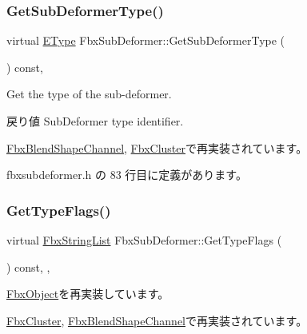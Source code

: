 \subsubsection{\texorpdfstring{Get\+Sub\+Deformer\+Type()}{GetSubDeformerType()}}
{\footnotesize\ttfamily virtual \hyperlink{class_fbx_sub_deformer_aed7eba8aabbb8b25a8ddbab127d67319}{E\+Type} Fbx\+Sub\+Deformer\+::\+Get\+Sub\+Deformer\+Type (\begin{DoxyParamCaption}{ }\end{DoxyParamCaption}) const\hspace{0.3cm}{\ttfamily [inline]}, {\ttfamily [virtual]}}

Get the type of the sub-\/deformer. \begin{DoxyReturn}{戻り値}
Sub\+Deformer type identifier. 
\end{DoxyReturn}


\hyperlink{class_fbx_blend_shape_channel_a1dba13e481ea7ba1874587ad92ee0347}{Fbx\+Blend\+Shape\+Channel}, \hyperlink{class_fbx_cluster_aa395931c54c7a8b7e23b1be50b32a1d6}{Fbx\+Cluster}で再実装されています。



 fbxsubdeformer.\+h の 83 行目に定義があります。

\mbox{\label{class_fbx_sub_deformer_a80652fd0521b2ea1897e221e5ae1b5cf}} 
\subsubsection{\texorpdfstring{Get\+Type\+Flags()}{GetTypeFlags()}}
{\footnotesize\ttfamily virtual \hyperlink{class_fbx_string_list}{Fbx\+String\+List} Fbx\+Sub\+Deformer\+::\+Get\+Type\+Flags (\begin{DoxyParamCaption}{ }\end{DoxyParamCaption}) const\hspace{0.3cm}{\ttfamily [inline]}, {\ttfamily [protected]}, {\ttfamily [virtual]}}



\hyperlink{class_fbx_object_a6d30a5d00400039a248977cf9f9255b2}{Fbx\+Object}を再実装しています。



\hyperlink{class_fbx_cluster_af989ca14bdf9e025f3db49183dc09811}{Fbx\+Cluster}, \hyperlink{class_fbx_blend_shape_channel_a354002154ea342025ba0936e656b640a}{Fbx\+Blend\+Shape\+Channel}で再実装されています。



